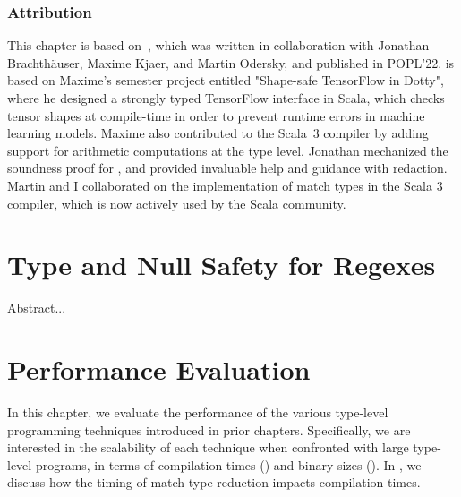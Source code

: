 \subsection*{Attribution}

This chapter is based on~\citep{blanvillain2022type}, which was written in collaboration with Jonathan Brachthäuser, Maxime Kjaer, and Martin Odersky, and published in POPL'22.  is based on Maxime's semester project entitled "Shape-safe TensorFlow in Dotty", where he designed a strongly typed TensorFlow interface in Scala, which checks tensor shapes at compile-time in order to prevent runtime errors in machine learning models. Maxime also contributed to the Scala~3 compiler by adding support for arithmetic computations at the type level. Jonathan mechanized the soundness proof for \SystemFm, and provided invaluable help and guidance with redaction. Martin and I collaborated on the implementation of match types in the Scala 3 compiler, which is now actively used by the Scala community.



\chapter[Case Study: Type and Null Safety for Regular Expressions]{Type and Null Safety for Regexes}
\label{chap:regex}

Abstract...





\chapter{Performance Evaluation}
\label{chap:performance-evaluation}

In this chapter, we evaluate the performance of the various type-level programming techniques introduced in prior chapters.
Specifically, we are interested in the scalability of each technique when confronted with large type-level programs, in terms of compilation times () and binary sizes ().
In , we discuss how the timing of match type reduction impacts compilation times.

